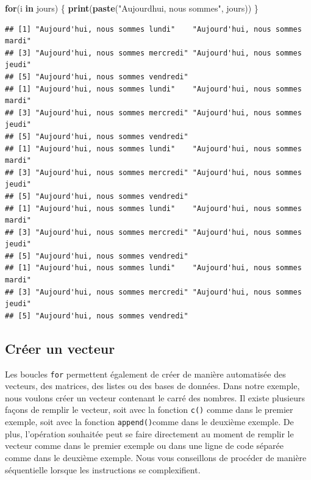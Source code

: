\documentclass[
]{book}
\newenvironment{Shaded}{\begin{snugshade}}{\end{snugshade}}
\newcommand{\ControlFlowTok}[1]{\textcolor[rgb]{0.13,0.29,0.53}{\textbf{#1}}}
\newcommand{\FunctionTok}[1]{\textcolor[rgb]{0.13,0.29,0.53}{\textbf{#1}}}
\newcommand{\NormalTok}[1]{#1}
\newcommand{\StringTok}[1]{\textcolor[rgb]{0.31,0.60,0.02}{#1}}
\begin{document}
\begin{Shaded}
\begin{Highlighting}[]
\ControlFlowTok{for}\NormalTok{(i }\ControlFlowTok{in}\NormalTok{ jours) \{}
  \FunctionTok{print}\NormalTok{(}\FunctionTok{paste}\NormalTok{(}\StringTok{"Aujourd\textquotesingle{}hui, nous sommes"}\NormalTok{, jours))}
\NormalTok{\}}
\end{Highlighting}
\end{Shaded}

\begin{verbatim}
## [1] "Aujourd'hui, nous sommes lundi"    "Aujourd'hui, nous sommes mardi"   
## [3] "Aujourd'hui, nous sommes mercredi" "Aujourd'hui, nous sommes jeudi"   
## [5] "Aujourd'hui, nous sommes vendredi"
## [1] "Aujourd'hui, nous sommes lundi"    "Aujourd'hui, nous sommes mardi"   
## [3] "Aujourd'hui, nous sommes mercredi" "Aujourd'hui, nous sommes jeudi"   
## [5] "Aujourd'hui, nous sommes vendredi"
## [1] "Aujourd'hui, nous sommes lundi"    "Aujourd'hui, nous sommes mardi"   
## [3] "Aujourd'hui, nous sommes mercredi" "Aujourd'hui, nous sommes jeudi"   
## [5] "Aujourd'hui, nous sommes vendredi"
## [1] "Aujourd'hui, nous sommes lundi"    "Aujourd'hui, nous sommes mardi"   
## [3] "Aujourd'hui, nous sommes mercredi" "Aujourd'hui, nous sommes jeudi"   
## [5] "Aujourd'hui, nous sommes vendredi"
## [1] "Aujourd'hui, nous sommes lundi"    "Aujourd'hui, nous sommes mardi"   
## [3] "Aujourd'hui, nous sommes mercredi" "Aujourd'hui, nous sommes jeudi"   
## [5] "Aujourd'hui, nous sommes vendredi"
\end{verbatim}

\subsection{Créer un vecteur}\label{cruxe9er-un-vecteur}

Les boucles \texttt{for} permettent également de créer de manière automatisée des vecteurs, des matrices, des listes ou des bases de données. Dans notre exemple, nous voulons créer un vecteur contenant le carré des nombres. Il existe plusieurs façons de remplir le vecteur, soit avec la fonction \texttt{c()} comme dans le premier exemple, soit avec la fonction \texttt{append()}comme dans le deuxième exemple. De plus, l'opération souhaitée peut se faire directement au moment de remplir le vecteur comme dans le premier exemple ou dans une ligne de code séparée comme dans le deuxième exemple. Nous vous conseillons de procéder de manière séquentielle lorsque les instructions se complexifient.
\end{document}
